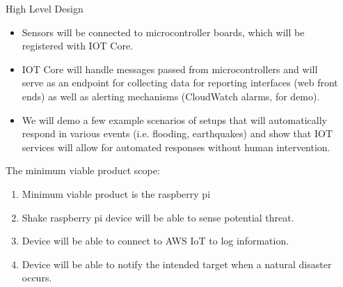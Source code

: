 \documentclass[final]{beamer}
\newlength{\onecolwid}
\newlength{\twocolwid}
\begin{document}
\begin{frame}[t]
\begin{columns}[t]
\begin{column}{\twocolwid}
\begin{columns}[t,totalwidth=\twocolwid]
\begin{column}{\onecolwid}\vspace{-.6in} %


\begin{block}{High Level Design}


\begin{itemize}
\item Sensors will be connected to microcontroller boards, which will be registered with IOT Core.
\item  IOT Core will handle messages passed from microcontrollers and will serve as an endpoint for collecting data for reporting interfaces (web front ends) as well as alerting mechanisms (CloudWatch alarms, for demo).
\item We will demo a few example scenarios of setups that will automatically respond in various events (i.e. flooding, earthquakes) and show that IOT services will allow for automated responses without human intervention.

\end{itemize}

The  minimum viable product scope:

\begin{enumerate}
\item Minimum viable product is the raspberry pi
\item Shake raspberry pi device will be  able to sense  potential threat.
\item Device will be able to connect to AWS IoT to log information.
\item Device will be able to notify the intended target when a natural disaster occurs.
\end{enumerate}

\end{block}


\end{column} %

\begin{column}{\onecolwid}\vspace{-.6in} %


\end{column}
\end{columns}
\end{column}
\end{columns}
\end{frame}
\end{document}
